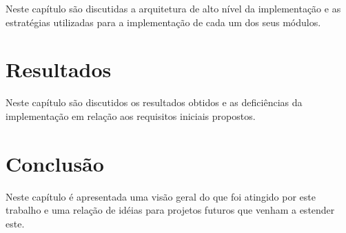 \documentclass[brazil,pagestart=firstchapter]{abnt}
\begin{document}
Neste capítulo são discutidas a arquitetura de alto nível da implementação e as
estratégias utilizadas para a implementação de cada um dos seus módulos.

\newpage









\chapter{Resultados}
\label{cap:resultados}

\vfill{}
\vfill{}

Neste capítulo são discutidos os resultados obtidos e as deficiências da
implementação em relação aos requisitos iniciais propostos.
\newpage



\chapter{Conclusão}
\label{cap:conclusao}
\vfill{}
\vfill{}

Neste capítulo é apresentada uma visão geral do que foi atingido por este trabalho
e uma relação de idéias para projetos futuros que venham a estender este.
\newpage


{}

\end{document}

